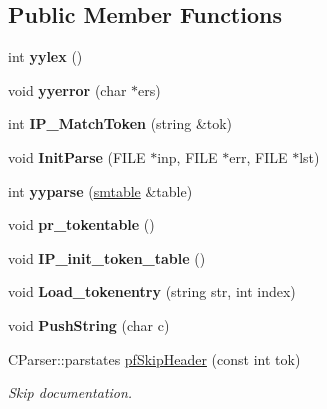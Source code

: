 \subsection*{Public Member Functions}
\begin{DoxyCompactItemize}
\item 
\mbox{\label{class_c_parser_a3d3b6419b0418f3957f46df645b451d4}} 
int {\bfseries yylex} ()
\item 
\mbox{\label{class_c_parser_a69f47a849390197859832118153ef4d5}} 
void {\bfseries yyerror} (char $\ast$ers)
\item 
\mbox{\label{class_c_parser_a779649c2cabcfb9327e5382e1f2da45d}} 
int {\bfseries I\+P\+\_\+\+Match\+Token} (string \&tok)
\item 
\mbox{\label{class_c_parser_ace28ad59dee35173b74ad45243a5647e}} 
void {\bfseries Init\+Parse} (F\+I\+LE $\ast$inp, F\+I\+LE $\ast$err, F\+I\+LE $\ast$lst)
\item 
\mbox{\label{class_c_parser_a97cafa394580fc324f86b8b4e6898fc2}} 
int {\bfseries yyparse} (\mbox{\hyperlink{classsmtable}{smtable}} \&table)
\item 
\mbox{\label{class_c_parser_a920fa2d0bc40d79e6aaa1e65b7dc8ac7}} 
void {\bfseries pr\+\_\+tokentable} ()
\item 
\mbox{\label{class_c_parser_a3984a1b7c01067a0c9003627bd1e7b28}} 
void {\bfseries I\+P\+\_\+init\+\_\+token\+\_\+table} ()
\item 
\mbox{\label{class_c_parser_a113fb940cecab830d72575580d43a35e}} 
void {\bfseries Load\+\_\+tokenentry} (string str, int index)
\item 
\mbox{\label{class_c_parser_a8658f8e0704065bf830c8b407c625578}} 
void {\bfseries Push\+String} (char c)
\item 
C\+Parser\+::parstates \mbox{\hyperlink{class_c_parser_a34572319cc6e7bacdc1e75503e1673e0}{pf\+Skip\+Header}} (const int tok)
\begin{DoxyCompactList}\small\item\em Skip documentation. \end{DoxyCompactList}\item 

\end{DoxyCompactItemize}
